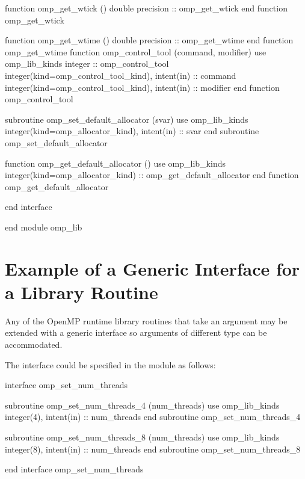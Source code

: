 {\begin{ompfFunction}
          function omp_get_wtick ()
           double precision :: omp_get_wtick
          end function omp_get_wtick

          function omp_get_wtime ()
           double precision :: omp_get_wtime
          end function omp_get_wtime
          function omp_control_tool (command, modifier)
           use omp_lib_kinds
           integer :: omp_control_tool
           integer(kind=omp_control_tool_kind), intent(in) :: command
           integer(kind=omp_control_tool_kind), intent(in) :: modifier
          end function omp_control_tool

          subroutine omp_set_default_allocator (svar)
           use omp_lib_kinds
           integer(kind=omp_allocator_kind), intent(in) :: svar
          end subroutine omp_set_default_allocator

          function omp_get_default_allocator ()
           use omp_lib_kinds
           integer(kind=omp_allocator_kind) :: omp_get_default_allocator
          end function omp_get_default_allocator

          end interface

        end module omp_lib
\end{ompfFunction}} %






\section{Example of a Generic Interface for a Library Routine}
\label{sec:Example of a Generic Interface for a Library Routine}
Any of the OpenMP runtime library routines that take an argument may be extended
with a generic interface so arguments of different  type can be accommodated.

The  interface could be specified in the  module
as follows:

\begin{ompfSubroutine}
interface omp_set_num_threads

    subroutine omp_set_num_threads_4 (num_threads)
      use omp_lib_kinds
      integer(4), intent(in) :: num_threads
    end subroutine omp_set_num_threads_4

    subroutine omp_set_num_threads_8 (num_threads)
      use omp_lib_kinds
      integer(8), intent(in) :: num_threads
    end subroutine omp_set_num_threads_8

end interface omp_set_num_threads
\end{ompfSubroutine}


